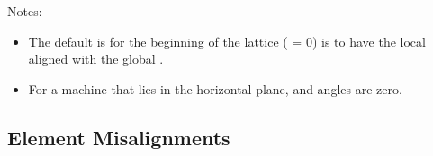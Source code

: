 \documentclass{hitec}
\begin{document}
Notes:
\vspace{-10 pt}
\begin{itemize}
\item The default is for the beginning of the lattice ( = 0) is to have the local  aligned with the 
global .
\item For a machine that lies in the horizontal plane, \vn{$\phi$} and \vn{$\psi$} angles are zero.
\end{itemize}

\newpage

\subsection{Element Misalignments}
\label{s:ele.mis}
\end{document}
